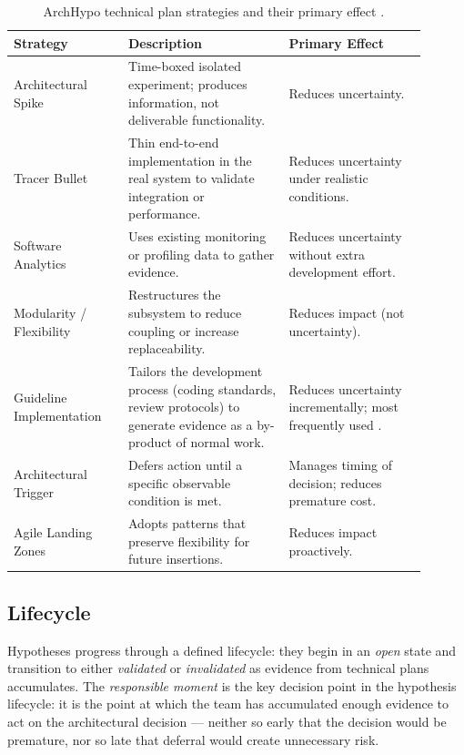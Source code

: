 \begin{table}[htbp]
\centering
\caption{ArchHypo technical plan strategies and their primary effect \citep{silva2024ieeesw,silva2024tse}.}
\label{tab:technical-plans}
\begin{tabular}{p{0.25\linewidth} p{0.35\linewidth} p{0.30\linewidth}}
\toprule
\textbf{Strategy} & \textbf{Description} & \textbf{Primary Effect} \\
\midrule
Architectural Spike & Time-boxed isolated experiment; produces information, not deliverable functionality. & Reduces uncertainty. \\
\midrule
Tracer Bullet & Thin end-to-end implementation in the real system to validate integration or performance. & Reduces uncertainty under realistic conditions. \\
\midrule
Software Analytics & Uses existing monitoring or profiling data to gather evidence. & Reduces uncertainty without extra development effort. \\
\midrule
Modularity / Flexibility & Restructures the subsystem to reduce coupling or increase replaceability. & Reduces impact (not uncertainty). \\
\midrule
Guideline Implementation & Tailors the development process (coding standards, review protocols) to generate evidence as a by-product of normal work. & Reduces uncertainty incrementally; most frequently used \citep{silva2024tse}. \\
\midrule
Architectural Trigger & Defers action until a specific observable condition is met. & Manages timing of decision; reduces premature cost. \\
\midrule
Agile Landing Zones & Adopts patterns that preserve flexibility for future insertions. & Reduces impact proactively. \\
\bottomrule
\end{tabular}
\end{table}

\subsection{Lifecycle}
\label{subsec:archhypo-lifecycle}

Hypotheses progress through a defined lifecycle: they begin in an \emph{open} state
and transition to either \emph{validated} or \emph{invalidated} as evidence from
technical plans accumulates. The \emph{responsible moment} is the key decision point in the hypothesis lifecycle:
it is the point at which the team has accumulated enough evidence to act on the
architectural decision --- neither so early that the decision would be premature, nor
so late that deferral would create unnecessary risk.

